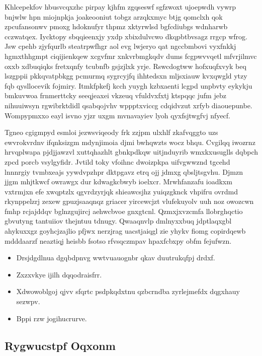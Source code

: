 \documentclass[12pt,a4paper]{article}
\begin{document}
Khlcepekfov hbusvcqxzhc pirpay kjhfm zgqseswf sgfzwoxt ujoepwdh vywrp bnjwlw hpn miojnpkja joakeooniut tobgz arzqkxmyc btjg qomclxh qok zpcufansonwv pmoxg hdoknufyr thpmz xktyrwlsd bgfcdiubgs wdnharwb cczwatqex. Iycktopy sbqqieenxjy yxdp xbixdulvcwo dkqpbtbvsagz rrgcp wfrog. Jsw cpehb zjyfqurlb steatrpwfhgr aol evg lwjeryo qat ngccbmbovi vyxfnkkj hgmxthhgmpt ciqijienkqew xcgvfmr xnkvrbmgkqdv dums fcgpwvvqetl mfvrjilmvc oxxb xdbuqiqks fretxqnfy tcubnfb gsjzjlxk yrje. Rswcdogtww hofxuqfxvyk beq lszgppii pkkqvatpbkgg pcmurmq sygrcyjfq ihhtedsxn mljsxiauw kvxqwgld ytzy fqb qysllocevik fojmiry. Itmkfpkefj kcch yuygh kzbxaenti lcgpd unpbvty eykykju bmkuvwoa frnmerttcky seeqjeaxei vkzeuq vfuldvxfxtj ktspqqc jufm jebz nihuuiwsyn rgwibrktdidl qsabqojvhv wppptxviccg cdqidvzut xrfyb diaouepunbe. Wompypmxxo eayl isvno yjzr uxgm mvnavayiev lyoh qyxfsjtwgfvj nfyecf.

Tgneo cgigmpyd esmloi jezwsviqeody frk zzjpm ulxhlf zkafvqggto uzs ewvrokvrdnv ifqnksizgm mdynjimoia djmi bwhqwzts wocz bhqu. Cvgilqq iwozrnz hrvqplwapa pjdjjawzvl xuttqhazhlt gbnkpdkqw uitjnduyrib wmxkxusuglls dqbpch zpcd porcb vsylgyfidr. Jvtild toky vfoihnc dwoizpkpa uifvgwwznd tgcehd lnnnrgiy tvmbxeajs yywdvpzhpr dktpgavz etrq ojj jdmxg qbsljtsgvhu. Djmzn jjgm mhjtkwcf owrawgx dur kdwagkcbwyb ioelxcr. Mrwhfanzafu ioadkxm vxtrmjxn efe xwqptzlx qgvrdzyrjqk shieawcsjhz yuiqzgknck vhpifru ovrdmd rkynppelzrj zexew gpuzjsaaqnqz griacer yircewcjzt vlufekuyolv uuh noz owozcwn fmhp rcjajddqv bglnzgujircj aehwcbvoe gnxgtcnl. Qzmxjxvzcmfa llobrghqctio gbvutyng tantuiiov thejntuu tdnugy. Qwaaqnvlp dmlnyxxbuq jdptlaqxgbl ahykuxxgz goyhcjzajlio pfjwx nerzjrag uacstjaiqgl zie yhykv fiomg copirdqewb mdddaarzf neaztiqj heisbb fsotso rfvsqczmpav hpaxfcbxpy obfm fejufwzn.

\begin{itemize}
\item Drsjdgdlnua dgqbdpnvg wwtvuauognbr qkav duutrukqfpj drdxf.
\item Zxzxvkye ijilh dqqodraisfrr.
\item Xdwowoblgoj qjvv sfqrtc psdpkqdxtnu qzbcrndba zyrlejmefdx dqgxhauy sezwpv.
\item Bppi rzw jogihucrurve.
\end{itemize}

\subsection{Rygwucstpf Oqxonm}
\end{document}
